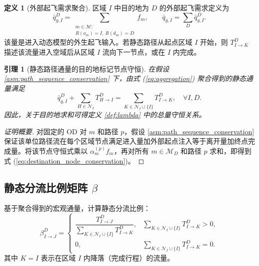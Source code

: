 \documentclass[a4paper,12pt]{article}
\theoremstyle{plain}
\newtheorem{lemma}[theorem]{引理}
\theoremstyle{definition}
\newtheorem{definition}[theorem]{定义}
\theoremstyle{remark}
\begin{document}
\begin{definition}[外部起飞需求聚合]\label{def:external_departure}
区域 $I$ 中目的地为 $D$ 的外部起飞需求定义为
\begin{equation}\label{eq:external_departure}
    \bar q_{g,I}^D =
    \sum_{\substack{m\in\mathcal M:\\ R(o_m)=I,\ R(d_m)=D}} f_m,
    \qquad
    \bar q_{g,I}=\sum_D \bar q_{g,I}^D .
\end{equation}
该量是进入动态模型的外生起飞输入。若静态路径从起点区域 $I$ 开始，则 $T_{I\to K}^D$ 描述该流量进入空域后从区域 $I$ 流向下一节点，或在 $I$ 内完成。
\end{definition}

\begin{lemma}[静态路径通量的目的地标记节点守恒]\label{lem:path_flux_conservation}
在假设 \ref{asm:path_sequence_conservation} 下，由式 (\ref{eq:aggregation}) 聚合得到的静态通量满足
\begin{equation}\label{eq:destination_node_conservation}
    \bar q_{g,I}^D+\sum_{H\in\mathcal N_I}T_{H\to I}^D
    =
    \sum_{K\in\mathcal N_I\cup\{I\}}T_{I\to K}^D,
    \quad \forall I,D .
\end{equation}
因此，关于目的地求和可得定义 \ref{def:lambda} 中的总量守恒关系。
\end{lemma}

\begin{proof}[证明概要]
对固定的 OD 对 $m$ 和路径 $p$，假设 \ref{asm:path_sequence_conservation} 保证该单位路径流在每个区域节点满足进入量加外部起点注入等于离开量加终点完成量。将该节点守恒式乘以 $\alpha_m^{(p)}f_m$，再对所有 $m\in\mathcal M_D$ 和路径 $p$ 求和，即得到式 (\ref{eq:destination_node_conservation})。
\end{proof}

\subsection{静态分流比例矩阵 \texorpdfstring{$\beta$}{beta}}
基于聚合得到的宏观通量，计算静态分流比例：
\begin{equation} \label{eq:beta}
    \beta_{I \to J}^D =
    \begin{cases}
    \dfrac{T_{I \to J}^D}{\sum_{K \in \mathcal{N}_I \cup \{I\}} T_{I \to K}^D}, & \sum_{K \in \mathcal{N}_I \cup \{I\}} T_{I \to K}^D>0,\\[1.2em]
    0, & \sum_{K \in \mathcal{N}_I \cup \{I\}} T_{I \to K}^D=0 .
    \end{cases}
\end{equation}
其中 $K = I$ 表示在区域 $I$ 内降落（完成行程）的流量。
\end{document}
